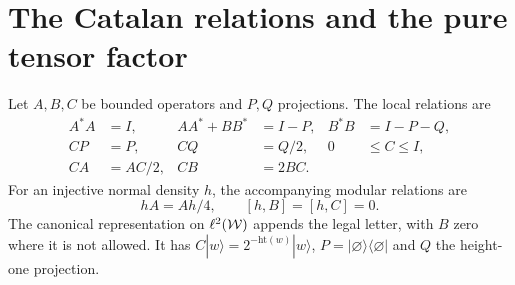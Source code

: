 \section{The Catalan relations and the pure tensor factor}\label{sec:catalan}
Let $A,B,C$ be bounded operators and $P,Q$ projections. The local relations are
\begin{align}
 A^*A&=I,& AA^*+BB^*&=I-P,& B^*B&=I-P-Q,\label{eq:R1}\\
 CP&=P,& CQ&=Q/2,&0&\leq C\leq I,\label{eq:R2}\\
 CA&=AC/2,&CB&=2BC.&&\label{eq:R3}
\end{align}
For an injective normal density $h$, the accompanying modular relations are
\begin{equation}\label{eq:modular}
 hA=Ah/4,\qquad [h,B]=[h,C]=0.
\end{equation}
The canonical representation on $\ell^2(\mathcal W)$ appends the legal letter, with $B$ zero where it is not allowed. It has $C|w\rangle=2^{-\mathrm{ht}(w)}|w\rangle$, $P=|\varnothing\rangle\langle\varnothing|$ and $Q$ the height-one projection.

